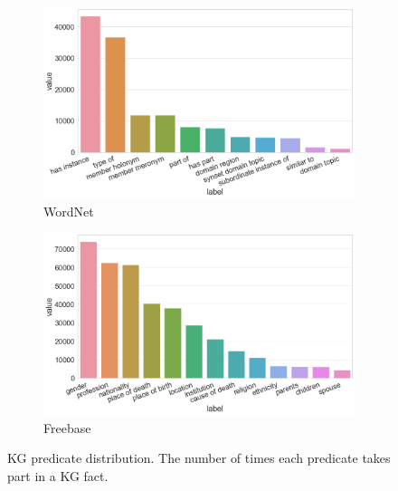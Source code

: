 \begin{figure}[H]
	\begin{subfigure}[b]{.5\linewidth}
   		\centering
    		\includegraphics[width=0.9\linewidth, height=0.6\linewidth]{Wordnet_Predicate_Counts}
		\captionsetup{justification=centering}
		\caption{WordNet}
	\end{subfigure}
	\begin{subfigure}[b]{.5\linewidth}
   		\centering
		\includegraphics[width=0.9\linewidth, height=0.6\linewidth]{Freebase_Predicate_Counts}
		\captionsetup{justification=centering}
		\caption{Freebase}
	\end{subfigure}
	\captionsetup{justification=centering}
	\caption{KG predicate distribution. The number of times each predicate takes part in a KG fact.}
\end{figure}

